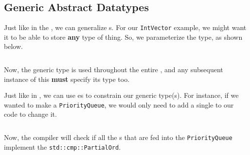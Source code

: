 \subsection{Generic Abstract Datatypes}\label{subsec:Generic_ADTs}
Just like in the , we can generalize s.
For our \texttt{IntVector} example, we might want it to be able to store \textbf{any} type of thing.
So, we parameterize the  type, as shown below.
\inputminted[frame=lines,linenos]{rust}{./EDAP05-Concepts_Programming_Languages-Sections/Abstract_Data_Types/Code/Generic_Vector.rs}

Now, the generic type  is used throughout the entire , and any subsequent instance of this  \textbf{must} specify its type too.

Just like in , we can use es to constrain our generic type(s).
For instance, if we wanted to make a \texttt{PriorityQueue}, we would only need to add a single  to our \texttt{} code to change it.
\inputminted[frame=lines,linenos]{rust}{./EDAP05-Concepts_Programming_Languages-Sections/Abstract_Data_Types/Code/PriorityQueue.rs}

Now, the compiler will check if all the s that are fed into the \texttt{PriorityQueue} implement the  \texttt{std::cmp::PartialOrd}.

